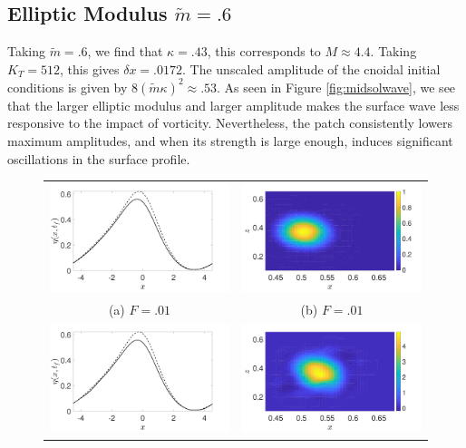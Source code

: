 \documentclass[a4paper,11pt]{article}
\begin{document}
\subsection*{Elliptic Modulus $\tilde{m}=.6$}
Taking $\tilde{m}=.6$, we find that $\kappa = .43$, this corresponds to $M \approx 4.4$.  Taking $K_{T}=512$, this gives $\delta x = .0172$.  The unscaled amplitude of the cnoidal initial conditions is given by $8(\tilde{m}\kappa)^{2}\approx .53$.  As seen in Figure \ref{fig:midsolwave}, we see that the larger elliptic modulus and larger amplitude makes the surface wave less responsive to the impact of vorticity.  Nevertheless, the patch consistently lowers maximum amplitudes, and when its strength is large enough, induces significant oscillations in the surface profile.  
\begin{figure}
\centering
\begin{tabular}{cc}
\includegraphics[width=.35\textwidth]{profiles_wm_1_modu_pt6} & \includegraphics[width=.35\textwidth]{vorticity_wm_1_modu_pt6}\\
(a)  $F=.01$ & (b)  $F=.01$\\
\includegraphics[width=.35\textwidth]{profiles_wm_5_modu_pt6} & \includegraphics[width=.35\textwidth]{vorticity_wm_5_modu_pt6}\\

\end{tabular}
\end{figure}
\end{document}
